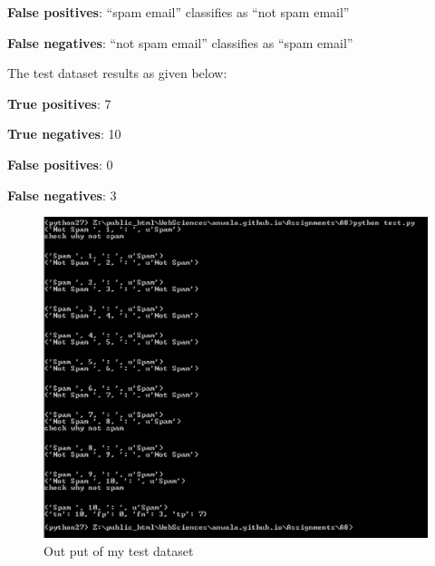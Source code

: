 \documentclass[letterpaper,11pt]{article}
\begin{document}
\textbf{False positives}: “spam email” classifies as “not spam email”

\textbf{False negatives}: “not spam email” classifies as “spam email”





The test dataset results as given below:

\textbf{True positives}: 7

\textbf{True negatives}: 10

\textbf{False positives}: 0

\textbf{False negatives}: 3



 \begin{figure}[h]
 \centering
 \includegraphics[scale=0.26]{output}
 \caption{Out put of my test dataset}
 \label{fig:dendro}
 \end{figure}
\clearpage





\clearpage

\end{document}

